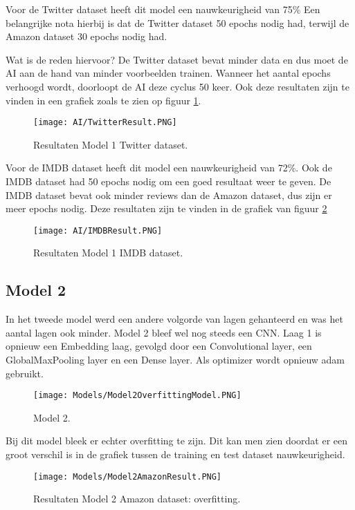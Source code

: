 Voor de Twitter dataset heeft dit model een nauwkeurigheid van 75\%
Een belangrijke nota hierbij is dat de Twitter dataset 50 epochs nodig had, terwijl de Amazon dataset 30 epochs nodig had.

Wat is de reden hiervoor?
De Twitter dataset bevat minder data en dus moet de AI aan de hand van minder voorbeelden trainen. Wanneer het aantal epochs verhoogd wordt, doorloopt de AI deze cyclus 50 keer. 
Ook deze resultaten zijn te vinden in een grafiek zoals te zien op figuur \ref{twitterresult}. 

\begin{figure}[!htbp]
    \texttt{[image: AI/TwitterResult.PNG]}
    \caption{\label{twitterresult}Resultaten Model 1 Twitter dataset.}
\end{figure}
\FloatBarrier

Voor de IMDB dataset heeft dit model een nauwkeurigheid van 72\%.
Ook de IMDB dataset had 50 epochs nodig om een goed resultaat weer te geven. De IMDB dataset bevat ook minder reviews dan de Amazon dataset, dus zijn er meer epochs nodig. Deze resultaten zijn te vinden in de grafiek van figuur \ref{imdbresult}

\begin{figure}[!htbp]
    \texttt{[image: AI/IMDBResult.PNG]}
    \caption{\label{imdbresult}Resultaten Model 1 IMDB dataset.}
\end{figure}
\FloatBarrier

\subsection{Model 2}
In het tweede model werd een andere volgorde van lagen gehanteerd en was het aantal lagen ook minder. Model 2 bleef wel nog steeds een \gls{CNN}. 
Laag 1 is opnieuw een Embedding laag, gevolgd door een Convolutional layer, een GlobalMaxPooling layer en een Dense layer.
Als optimizer wordt opnieuw adam gebruikt.

\begin{figure}[!htbp]
    \texttt{[image: Models/Model2OverfittingModel.PNG]}
    \caption{\label{overfitting} Model 2.}
\end{figure}
\FloatBarrier

Bij dit model bleek er echter overfitting te zijn. Dit kan men zien doordat er een groot verschil is in de grafiek tussen de training en test dataset nauwkeurigheid.

\begin{figure}[!htbp]
    \texttt{[image: Models/Model2AmazonResult.PNG]}
    \caption{\label{overfittingresult} Resultaten Model 2 Amazon dataset: overfitting.}
\end{figure}
\FloatBarrier

